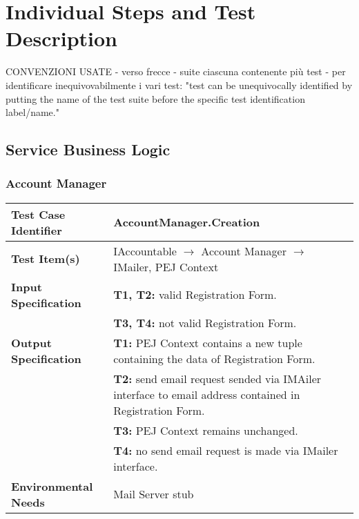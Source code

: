 \section{Individual Steps and Test Description}


CONVENZIONI USATE
- verso frecce
- suite ciascuna contenente più test
- per identificare inequivovabilmente i vari test: "test can be unequivocally identified by putting the name of the test suite before the specific test identification label/name."


{\renewcommand{\arraystretch}{1.2}%

\subsection{Service Business Logic}
\subsubsection{Account Manager}
\begin{tabularx}{\textwidth}{l X}
    \hline 
    \textbf{Test Case Identifier} & AccountManager.Creation\\ 
    \hline 
    
    \textbf{Test Item(s)} & IAccountable $\rightarrow$ Account Manager $\rightarrow$ IMailer, PEJ Context\\
    \hline 
    
    \textbf{Input Specification} &  \textbf{T1, T2:} valid Registration Form.\\
                                &   \textbf{T3, T4:} not valid Registration Form.\\

    \hline 
    
    \textbf{Output Specification} & \textbf{T1:} PEJ Context contains a new tuple containing the data of Registration Form.\\
                                &   \textbf{T2:} send email request sended via IMAiler interface to email address contained in Registration Form.\\
                                & \textbf{T3:} PEJ Context remains unchanged.\\
                                & \textbf{T4:} no send email request is made via IMailer interface.\\
    \hline 
    
    \textbf{Environmental Needs} &  Mail Server stub\\
    \hline
\end{tabularx}
\bigskip

}
